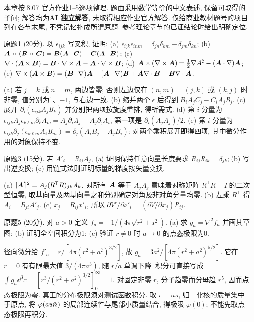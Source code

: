 本章按 8.07 官方作业1--5逐项整理. 题面采用数学等价的中文表述, 保留可取得的子问; 解答均为\textbf{AI 独立解答}, 未取得相应作业官方解答. 仅给商业教材题号的项目列在各节末尾, 不凭记忆补成所谓原题. 参考理论章节的已证结论时给出明确定位.

\begin{exercise}
原题1 (20分). 以 $\epsilon_{ijk}$ 写叉积, 证明: (a) $\epsilon_{ijk}\epsilon_{inm}=\delta_{jn}\delta_{km}-\delta_{jm}\delta_{kn}$; (b) $\boldsymbol{A}\times(\boldsymbol{B}\times\boldsymbol{C})=\boldsymbol{B}(\boldsymbol{A}\cdot\boldsymbol{C})-\boldsymbol{C}(\boldsymbol{A}\cdot\boldsymbol{B})$; (c) $\nabla\cdot(\boldsymbol{A}\times\boldsymbol{B})=\boldsymbol{B}\cdot\nabla\times\boldsymbol{A}-\boldsymbol{A}\cdot\nabla\times\boldsymbol{B}$; (d) $\boldsymbol{A}\times(\nabla\times\boldsymbol{A})=\frac12\nabla A^2-(\boldsymbol{A}\cdot\nabla)\boldsymbol{A}$; (e) $\nabla\times(\boldsymbol{A}\times\boldsymbol{B})=(\boldsymbol{B}\cdot\nabla)\boldsymbol{A}-(\boldsymbol{A}\cdot\nabla)\boldsymbol{B}+\boldsymbol{A}\nabla\cdot\boldsymbol{B}-\boldsymbol{B}\nabla\cdot\boldsymbol{A}$.
\end{exercise}
\begin{solution}
(a) 若 $j=k$ 或 $n=m$, 两边皆零; 否则左边仅在 $(n,m)=(j,k)$ 或 $(k,j)$ 时非零, 值分别为1、$-1$, 与右边一致. (b) 缩并两个 $\epsilon$ 后得到 $B_iA_jC_j-C_iA_jB_j$. (c) 展开 $\partial_i(\epsilon_{ijk}A_jB_k)$ 并分别把两项按旋度重排, 得所需式. (d) 第 $i$ 分量为 $\epsilon_{ijk}A_j\epsilon_{k\ell m}\partial_\ell A_m=A_j\partial_iA_j-A_j\partial_jA_i$, 第一项是 $\partial_i(A_jA_j)/2$. (e) 第 $i$ 分量为 $\epsilon_{ijk}\partial_j(\epsilon_{k\ell m}A_\ell B_m)=\partial_j(A_iB_j-A_jB_i)$; 对两个乘积展开即得四项, 其中微分作用的对象保持不变.
\end{solution}
\begin{exercise}
原题3 (15分). 若 $A'_i=R_{ij}A_j$, (a) 证明保持任意向量长度要求 $R_{ij}R_{ik}=\delta_{jk}$; (b) 写出逆变换; (c) 用链式法则证明标量的梯度按矢量变换.
\end{exercise}
\begin{solution}
(a) $|\boldsymbol{A}'|^2=A_j(R^\mathsf TR)_{jk}A_k$. 对所有 $\boldsymbol{A}$ 等于 $A_jA_j$ 意味着对称矩阵 $R^\mathsf TR-I$ 的二次型恒零, 取基向量及两基向量之和分别确定对角及非对角分量均零. (b) 左乘 $R^\mathsf T$ 得 $A_i=R_{ji}A'_j$. (c) $x_j=R_{ij}x'_i$, 所以 $\partial V'/\partial x'_i=(\partial V/\partial x_j)R_{ij}$.
\end{solution}
\begin{exercise}
原题5 (20分). 对 $a>0$ 定义 $f_a=-1/(4\pi\sqrt{r^2+a^2})$. (a) 求 $g_a=\nabla^2f_a$ 并画其草图; (b) 证明全空间积分为1; (c) 验证 $r\ne0$ 时 $a\to0$ 的点态极限为0.
\end{exercise}
\begin{solution}
径向微分给 $f'_a=r/[4\pi(r^2+a^2)^{3/2}]$, 故 $g_a=3a^2/[4\pi(r^2+a^2)^{5/2}]$. 它在 $r=0$ 有有限最大值 $3/(4\pi a^3)$, 随 $r/a$ 单调下降. 积分可直接写成 $\int g_a\dd^3x=[r^3/(r^2+a^2)^{3/2}]_0^\infty=1$. 对固定非零 $r$, 分子趋零而分母趋 $r^5$, 因而点态极限为零. 真正的分布极限须对测试函数积分: 取 $r=au$, 归一化核的质量集中于原点, 将 $\varphi(au\hat{\boldsymbol{n}})$ 的局部连续性与尾部小质量结合, 得极限 $\varphi(0)$; 不能先取点态极限再积分.
\end{solution}
